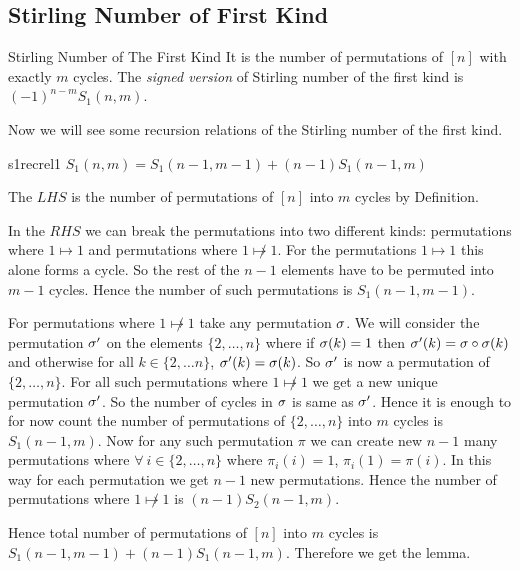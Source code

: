 \documentclass[twoside]{article}
\begin{document}
\subsection{Stirling Number of First Kind}
\begin{Definition}{Stirling Number of The First Kind}{}
	It is the number of permutations of $[n]$ with exactly $m$ cycles. The \textit{signed version} of Stirling number of the first kind is $(-1)^{n-m}S_1(n,m)$.
\end{Definition}
Now we will see some recursion relations of the Stirling number of the first kind. 
\begin{lemma}{}{s1recrel1}
	$S_1(n,m)=S_1(n-1,m-1)+(n-1)S_1(n-1,m)$
\end{lemma}
\begin{combi-proof}
	The $LHS$ is the number of permutations of $[n]$ into $m$ cycles by Definition. 
	
	In the $RHS$ we can break the permutations into two different kinds: permutations where $1\mapsto1$ and permutations where $1\not\mapsto 1$. For the permutations $1\mapsto1$ this alone forms a cycle. So the rest of the $n-1$ elements have to be permuted into $m-1$ cycles. Hence the number of such permutations is $S_1(n-1,m-1)$.
	
	For permutations where $1\not\mapsto 1$ take any permutation $\sigma$. We will consider the permutation $\sigma'$ on the elements $\{2,\dots, n\}$ where if $\sigma(k)=1$ then $\sigma'(k)=\sigma\circ\sigma(k)$ and otherwise for all $k\in \{2,\dots n\}$, $\sigma'(k)=\sigma(k)$. So $\sigma'$ is now a permutation of $\{2,\dots, n\}$. For all such permutations where $1\not\mapsto 1$ we get a new unique permutation $\sigma'$. So the number of cycles in $\sigma$ is same as $\sigma'$. Hence it is enough to for now count the number of permutations of $\{2,\dots,n\}$ into $m$ cycles  is $S_1(n-1,m)$. Now for any such permutation $\pi$ we can create new $n-1$ many permutations where $\forall\ i\in\{2,\dots, n\}$ where  $\pi_i(i)=1$, $\pi_i(1)=\pi(i)$. In this way for each permutation we get $n-1$ new permutations. Hence the number of permutations where $1\not\mapsto 1$ is $(n-1)S_2(n-1,m)$. 
	
	Hence total number of permutations of $[n]$ into $m$ cycles is $S_1(n-1,m-1)+(n-1)S_1(n-1,m)$. Therefore we get the lemma. 
\end{combi-proof}
\end{document}
